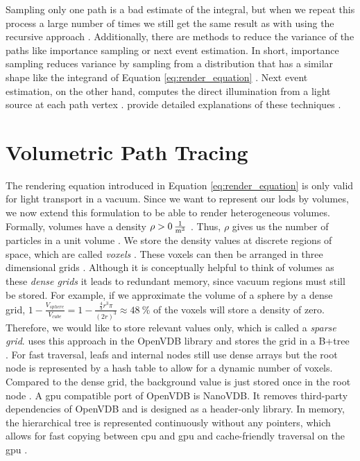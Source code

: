 Sampling only one path is a bad estimate of the integral, but when we repeat this process a large number of times we still get the same result as with using the recursive approach \cite{pbr}.
Additionally, there are methods to reduce the variance of the paths like importance sampling or next event estimation.
In short, importance sampling reduces variance by sampling from a distribution that has a similar shape like the integrand of Equation \ref{eq:render_equation} \cite{rendering_equation}.
Next event estimation, on the other hand, computes the direct illumination from a light source at each path vertex \cite{pbr}.
\citeauthor{pbr} provide detailed explanations of these techniques \cite{pbr}.

\section{Volumetric Path Tracing}
The rendering equation introduced in Equation \ref{eq:render_equation} is only valid for light transport in a vacuum.
Since we want to represent our \acsp{lod} by volumes, we now extend this formulation to be able to render heterogeneous volumes.
Formally, volumes have a density ${\rho > \SI{0}{\frac{1}{\m^3}}}$ \cite{pbr}.
Thus, $\rho$ gives us the number of particles in a unit volume \cite{novak_overview}.
We store the density values at discrete regions of space, which are called \textit{voxels} \cite{pbr}.
These voxels can then be arranged in three dimensional grids \cite{pbr}.
Although it is conceptually helpful to think of volumes as these \textit{dense grids} it leads to redundant memory, since vacuum regions must still be stored.
For example, if we approximate the volume of a sphere by a dense grid, $1 - \frac{V_{sphere}}{V_{cube}} = 1 - \frac{\frac{4}{3}r^3\pi}{(2r)^3}\approx \SI{48}{\%}$ of the voxels will store a density of zero.
Therefore, we would like to store relevant values only, which is called a \textit{sparse grid}.
\citeauthor{museth_vdb} uses this approach in the OpenVDB library and stores the grid in a B+tree \cite{museth_vdb}.
For fast traversal, leafs and internal nodes still use dense arrays but the root node is represented by a hash table to allow for a dynamic number of voxels.
Compared to the dense grid, the background value is just stored once in the root node \cite{museth_vdb}.
A \ac{gpu} compatible port of OpenVDB is NanoVDB.
It removes third-party dependencies of OpenVDB and is designed as a header-only library.
In memory, the hierarchical tree is represented continuously without any pointers, which allows for fast copying between \ac{cpu} and \ac{gpu} and cache-friendly traversal on the \ac{gpu} \cite{museth_nanovdb}.

